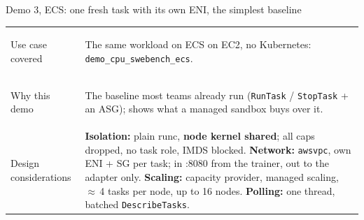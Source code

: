\begin{frame}{Demo 3, ECS: one fresh task with its own ENI, the simplest baseline}
\footnotesize
\begin{tabularx}{\textwidth}{@{}>{\bfseries\raggedright\arraybackslash}p{2.4cm}X@{}}
\toprule
Use case covered & The same workload on ECS on EC2, no Kubernetes: \texttt{demo\_cpu\_swebench\_ecs}.\\
Why this demo & The baseline most teams already run (\texttt{RunTask} / \texttt{StopTask} + an ASG); shows what a managed sandbox buys over it.\\
Design considerations & \textbf{Isolation:} plain runc, \textbf{node kernel shared}; all caps dropped, no task role, IMDS blocked.\newline
\textbf{Network:} \texttt{awsvpc}, own ENI + SG per task; in :8080 from the trainer, out to the adapter only.\newline
\textbf{Scaling:} capacity provider, managed scaling, $\approx$\,4 tasks per node, up to 16 nodes.\newline
\textbf{Polling:} one thread, batched \texttt{DescribeTasks}.\\
\bottomrule
\end{tabularx}
\end{frame}

